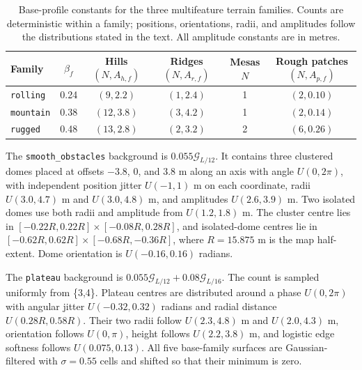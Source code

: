 \documentclass[11pt]{article}
\begin{document}
\begin{table}[htbp]
  \centering
  \caption{Base-profile constants for the three multifeature terrain families.
  Counts are deterministic within a family; positions, orientations, radii,
  and amplitudes follow the distributions stated in the text. All amplitude
  constants are in metres.}
  \label{tab:family-parameters}
  \footnotesize
  \begin{tabular}{lccccc}
    \toprule
    Family & $\beta_f$ & \shortstack{Hills\\$(N,A_{h,f})$} &
    \shortstack{Ridges\\$(N,A_{r,f})$} & \shortstack{Mesas\\$N$} &
    \shortstack{Rough patches\\$(N,A_{p,f})$} \\
    \midrule
    \texttt{rolling}  & 0.24 & $(9,2.2)$  & $(1,2.4)$ & 1 & $(2,0.10)$ \\
    \texttt{mountain} & 0.38 & $(12,3.8)$ & $(3,4.2)$ & 1 & $(2,0.14)$ \\
    \texttt{rugged}   & 0.48 & $(13,2.8)$ & $(2,3.2)$ & 2 & $(6,0.26)$ \\
    \bottomrule
  \end{tabular}
\end{table}

The \texttt{smooth\_obstacles} background is
$0.055\mathcal{G}_{L/12}$. It contains three clustered domes placed at
offsets $-3.8$, 0, and 3.8 m along an axis with angle $U(0,2\pi)$, with
independent position jitter $U(-1,1)$ m on each coordinate, radii
$U(3.0,4.7)$ m and $U(3.0,4.8)$ m, and amplitudes
$U(2.6,3.9)$ m. Two isolated domes use both radii and amplitude from
$U(1.2,1.8)$ m. The cluster centre lies in
$[-0.22R,0.22R]\times[-0.08R,0.28R]$, and isolated-dome centres lie in
$[-0.62R,0.62R]\times[-0.68R,-0.36R]$, where $R=15.875$ m is the map
half-extent. Dome orientation is $U(-0.16,0.16)$ radians.

The \texttt{plateau} background is
$0.055\mathcal{G}_{L/12}+0.08\mathcal{G}_{L/16}$. The count is sampled
uniformly from \{3,4\}. Plateau centres are distributed around a phase
$U(0,2\pi)$
with angular jitter $U(-0.32,0.32)$ radians and radial distance
$U(0.28R,0.58R)$. Their two radii follow $U(2.3,4.8)$ m and
$U(2.0,4.3)$ m, orientation follows $U(0,\pi)$, height follows
$U(2.2,3.8)$ m, and logistic edge softness follows $U(0.075,0.13)$. All five
base-family surfaces are Gaussian-filtered with $\sigma=0.55$ cells and shifted
so that their minimum is zero.
\end{document}

